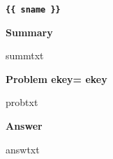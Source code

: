 \documentclass{article}
\begin{document}
{\centering\bf \verb"{{ sname }}" }

\noindent\textbf{Summary}

{{ summtxt  }}

\noindent\textbf{Problem ekey={{ ekey }} }

{{ probtxt }} 

\noindent\textbf{Answer}

{{ answtxt  }}
\end{document}
